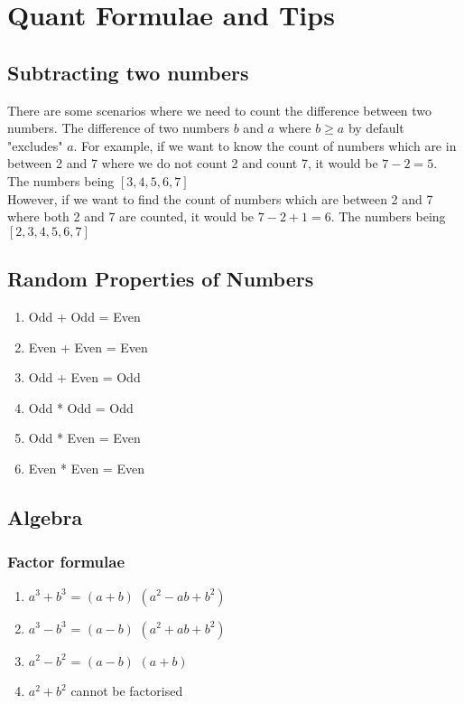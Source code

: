\chapter{Quant Formulae and Tips}

\section{Subtracting two numbers} \label{sub-two-nums}

There are some scenarios where we need to count the difference between two numbers. The difference of two numbers $b$ and $a$ where $b \geq a$ by default "excludes" $a$. For example, if we want to know the count of numbers which are in between 2 and 7 where we do not count 2 and count 7, it would be $7 - 2 = 5$. The numbers being $[3,4,5,6,7]$ \\

However, if we want to find the count of numbers which are between 2 and 7 where both 2 and 7 are counted, it would be $ 7 - 2 + 1 = 6$. The numbers being $[2,3,4,5,6,7]$

\section{Random Properties of Numbers}
\begin{enumerate}
    \item Odd + Odd = Even
    \item Even + Even = Even
    \item Odd + Even = Odd
    \item Odd * Odd = Odd
    \item Odd * Even = Even
    \item Even * Even = Even
\end{enumerate}

\section{Algebra}
\subsection{Factor formulae} \label{algebra-factor-formulae}
\begin{enumerate}
    \item $a^3 + b^3$ = $(a+b)$ $(a^2 - ab + b^2)$
    \item $a^3 - b^3$ = $(a-b)$ $(a^2 + ab + b^2)$
    \item $a^2 - b^2$ = $(a-b)$ $ (a+b)$
    \item $a^2 + b^2$ cannot be factorised
\end{enumerate}

